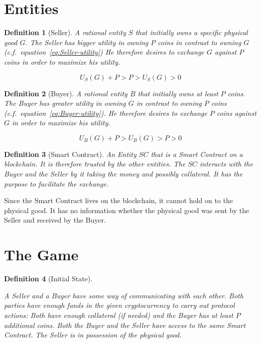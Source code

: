 \documentclass{cacthesis}
\newtheorem{definition}{Definition}
\begin{document}
\section{Entities}

\begin{definition}[Seller]
\label{def:Seller}
A rational entity $S$ that initially owns a specific physical good $G$. The Seller
has bigger utility in owning $P$ coins in contrast to owning $G$ (c.f.~equation~\ref{eq:Seller-utility}) He therefore desires to exchange $G$ against $P$ coins in order to maximize his utility.
\end{definition}

\begin{equation}
\label{eq:Seller-utility}
    U_S(G) + P > P > U_S(G) > 0
\end{equation}

\begin{definition}[Buyer]
\label{def:Buyer}
A rational entity $B$ that initially owns at least $P$ coins. The Buyer has greater utility in owning $G$ in contrast to  owning $P$ coins (c.f.~equation~\ref{eq:Buyer-utility}). He therefore desires to exchange $P$ coins against $G$ in order to maximize his utility.
\end{definition}

\begin{equation}
\label{eq:Buyer-utility}
    U_B(G) + P > U_B(G) > P > 0
\end{equation}

\begin{definition}[Smart Contract]
An Entity $SC$ that is a Smart Contract on a blockchain. It is therefore trusted by the other entities. The $SC$ interacts with the Buyer and the Seller by it taking the money and possibly collateral. It has the purpose to facilitate the exchange.
\end{definition}
Since the Smart Contract lives on the blockchain, it cannot hold on to the physical good. It has no information whether the physical good was sent by the Seller and received by the Buyer. 

\section{The Game}
\label{sec:the-game}
\begin{definition}[Initial State]
\label{def:initial-state}

A Seller and a Buyer have some way of communicating with each other. Both parties have enough funds in the given cryptocurrency to carry out protocol actions: Both have enough collateral (if needed) and the Buyer has at least $P$ additional coins. Both the Buyer and the Seller have access to the same Smart Contract. The Seller is in possession of the physical good.
\end{definition} 
\end{document}
